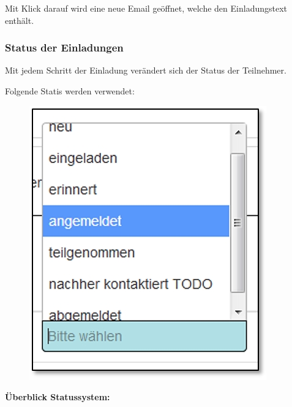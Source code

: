 Mit Klick darauf wird eine neue Email geöffnet, welche den Einladungstext enthält.

\subsubsection{Status der Einladungen}

Mit jedem Schritt der Einladung verändert sich der Status der Teilnehmer.

Folgende Statis werden verwendet:

\begin{figure}   %
  \vspace{-10pt}      %
  \begin{center}
    \includegraphics[width=.8\linewidth]{../chapters/10_CRM/pictures/10-2-5_Status.jpg}
  \end{center}
  \vspace{-20pt}
  \vspace{-10pt}
\end{figure}


\textbf{Überblick Statussystem:}

